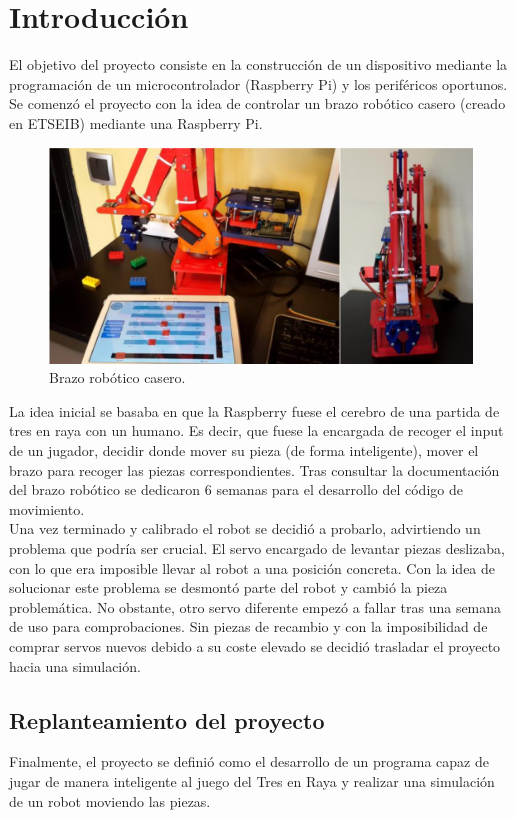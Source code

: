 \documentclass[11pt]{article}
\begin{document}
\section{Introducción}

El objetivo del proyecto consiste en la construcción de un dispositivo mediante
la programación de un microcontrolador (Raspberry Pi) y los periféricos
oportunos. Se comenzó el proyecto con la idea de controlar un brazo robótico
casero (creado en ETSEIB) mediante una Raspberry Pi. \\

\begin{figure}[htbp]
  \centering
  \includegraphics[width = .6\textwidth]{Robot.png}
  \caption{Brazo robótico casero.}
  \label{fig:brazo_robotico}
\end{figure}

La idea inicial se basaba en que la Raspberry fuese el cerebro de una partida de
tres en raya con un humano. Es decir, que fuese la encargada de recoger el input
de un jugador, decidir donde mover su pieza (de forma inteligente), mover el
brazo para recoger las piezas correspondientes. Tras consultar la documentación
del brazo robótico se dedicaron 6 semanas para el desarrollo del código de
movimiento. \\

Una vez terminado y calibrado el robot se decidió a probarlo, advirtiendo un
problema que podría ser crucial. El servo encargado de levantar piezas
deslizaba, con lo que era imposible llevar al robot a una posición concreta. Con
la idea de solucionar este problema se desmontó parte del robot y cambió la
pieza problemática. No obstante, otro servo diferente empezó a fallar tras una
semana de uso para comprobaciones. Sin piezas de recambio y con la imposibilidad
de comprar servos nuevos debido a su coste elevado se decidió trasladar el
proyecto hacia una simulación.


\subsection{Replanteamiento del proyecto}
Finalmente, el proyecto se definió como el desarrollo de un programa capaz de
jugar de manera inteligente al juego del Tres en Raya y realizar una simulación
de un robot moviendo las piezas. \\
\end{document}
